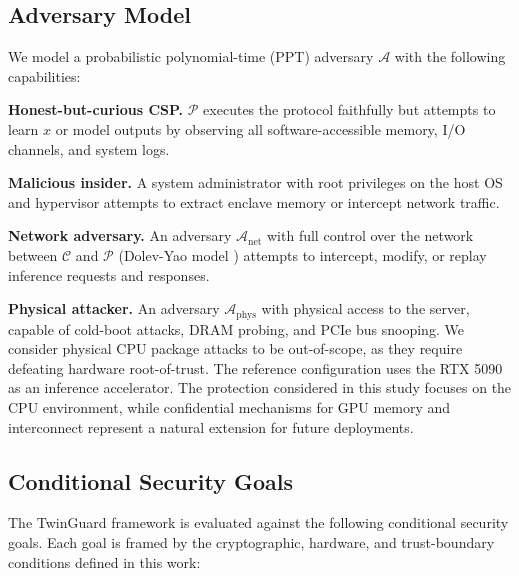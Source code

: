 \documentclass{ieeeaccess}
\begin{document}
\subsection{Adversary Model}

We model a probabilistic polynomial-time (PPT) adversary $\mathcal{A}$ with the
following capabilities:

\textbf{Honest-but-curious CSP.} $\mathcal{P}$ executes the protocol
faithfully but attempts to learn $x$ or model outputs by observing all
software-accessible memory, I/O channels, and system logs.

\textbf{Malicious insider.} A system administrator with root privileges
on the host OS and hypervisor attempts to extract enclave memory or intercept
network traffic.

\textbf{Network adversary.} An adversary $\mathcal{A}_{\text{net}}$ with
full control over the network between $\mathcal{C}$ and $\mathcal{P}$
(Dolev-Yao model \cite{dolev1983security}) attempts to intercept, modify,
or replay inference requests and responses.

\textbf{Physical attacker.} An adversary $\mathcal{A}_{\text{phys}}$ with
physical access to the server, capable of cold-boot attacks, DRAM probing,
and PCIe bus snooping. We consider physical CPU package attacks to be
out-of-scope, as they require defeating hardware root-of-trust.
The reference configuration uses the RTX 5090 as an inference accelerator.
The protection considered in this study focuses on the CPU environment, while
confidential mechanisms for GPU memory and interconnect represent a natural
extension for future deployments.

\subsection{Conditional Security Goals}

The TwinGuard framework is evaluated against the following conditional
security goals. Each goal is framed by the cryptographic, hardware, and
trust-boundary conditions defined in this work:
\end{document}
